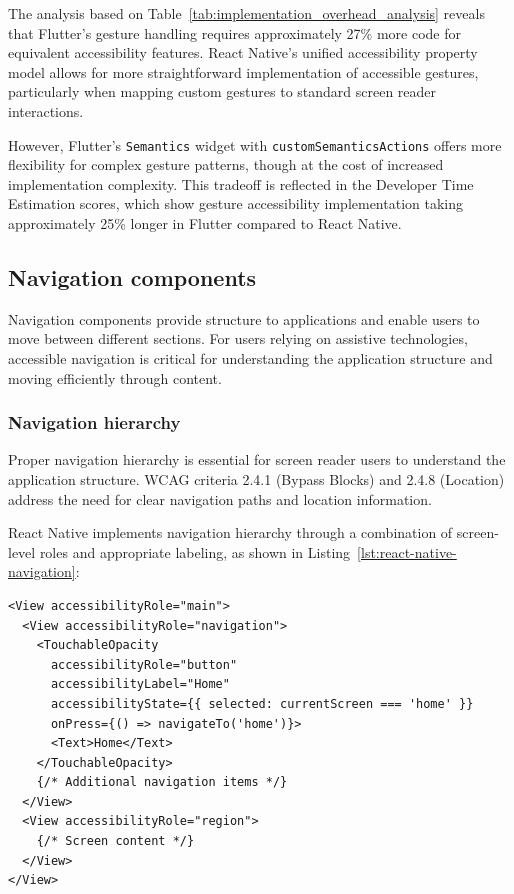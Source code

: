 The analysis based on Table~\ref{tab:implementation_overhead_analysis} reveals that Flutter's gesture handling requires approximately 27\% more code for equivalent accessibility features. React Native's unified accessibility property model allows for more straightforward implementation of accessible gestures, particularly when mapping custom gestures to standard screen reader interactions.

However, Flutter's \texttt{Semantics} widget with \texttt{customSemanticsActions} offers more flexibility for complex gesture patterns, though at the cost of increased implementation complexity. This tradeoff is reflected in the Developer Time Estimation scores, which show gesture accessibility implementation taking approximately 25\% longer in Flutter compared to React Native.

\subsection{Navigation components}
\label{subsec:navigation-components}

Navigation components provide structure to applications and enable users to move between different sections. For users relying on assistive technologies, accessible navigation is critical for understanding the application structure and moving efficiently through content.

\subsubsection{Navigation hierarchy}
\label{subsubsec:navigation-hierarchy}

Proper navigation hierarchy is essential for screen reader users to understand the application structure. WCAG criteria 2.4.1 (Bypass Blocks) and 2.4.8 (Location) address the need for clear navigation paths and location information.

React Native implements navigation hierarchy through a combination of screen-level roles and appropriate labeling, as shown in Listing~\ref{lst:react-native-navigation}:

\begin{lstlisting}[style=ReactNativeStyle, caption=Navigation hierarchy in React Native, label=lst:react-native-navigation]
<View accessibilityRole="main">
  <View accessibilityRole="navigation">
    <TouchableOpacity
      accessibilityRole="button"
      accessibilityLabel="Home"
      accessibilityState={{ selected: currentScreen === 'home' }}
      onPress={() => navigateTo('home')}>
      <Text>Home</Text>
    </TouchableOpacity>
    {/* Additional navigation items */}
  </View>
  <View accessibilityRole="region">
    {/* Screen content */}
  </View>
</View>
\end{lstlisting}

